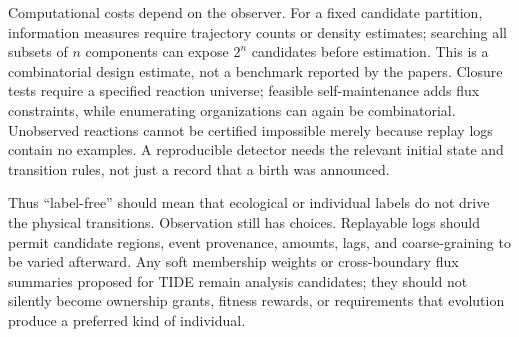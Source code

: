 Computational costs depend on the observer. For a fixed candidate partition,
information measures require trajectory counts or density estimates; searching
all subsets of $n$ components can expose $2^n$ candidates before estimation.
This is a combinatorial design estimate, not a benchmark reported by the
papers. Closure tests require a specified reaction universe; feasible
self-maintenance adds flux constraints, while enumerating organizations can
again be combinatorial. Unobserved reactions cannot be certified impossible
merely because replay logs contain no examples. A reproducible detector needs
the relevant initial state and transition rules, not just a record that a
birth was announced.

Thus ``label-free'' should mean that ecological or individual labels do not
drive the physical transitions. Observation still has choices. Replayable
logs should permit candidate regions, event provenance, amounts, lags, and
coarse-graining to be varied afterward. Any soft membership weights or
cross-boundary flux summaries proposed for TIDE remain analysis candidates;
they should not silently become ownership grants, fitness rewards, or
requirements that evolution produce a preferred kind of individual.
